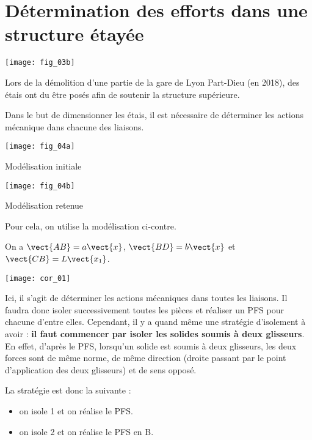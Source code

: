 \section*{Détermination des efforts dans une structure étayée}

\ifprof
\else

\begin{marginfigure}
\texttt{[image: fig\_03b]}
\end{marginfigure}

Lors de la démolition d'une partie de la gare de Lyon Part-Dieu (en 2018), des étais ont du être posés afin de soutenir la structure supérieure. 


Dans le but de dimensionner les étais, il est nécessaire de déterminer les actions mécanique dans chacune des liaisons. 


\begin{marginfigure}
\centering
\texttt{[image: fig\_04a]}
\caption{Modélisation initiale}
\end{marginfigure}


\begin{marginfigure}
\centering
\texttt{[image: fig\_04b]}
\caption{Modélisation retenue}
\end{marginfigure}

Pour cela, on utilise la modélisation ci-contre. 



On a $\vect{AB}=a \vect{x}$,  $\vect{BD}=b \vect{x}$ et  $\vect{CB}=L \vect{x_1}$.
\fi

\ifprof
\begin{corrige}
\begin{center}
\texttt{[image: cor\_01]}
\end{center}

\end{corrige}
\else
\fi

\ifprof
\begin{corrige}
Ici, il s'agit de déterminer les actions mécaniques dans toutes les liaisons. Il faudra donc isoler successivement toutes les pièces et réaliser un PFS pour chacune d'entre elles. Cependant, il y a quand même une stratégie d'isolement à avoir : \textbf{il faut commencer par isoler les solides soumis à deux glisseurs}. En effet, d'après le PFS, lorsqu'un solide est soumis à deux glisseurs, les deux forces sont de même norme, de même direction (droite passant par le point d'application des deux glisseurs) et de sens opposé. 

La stratégie est donc la suivante : 
\begin{itemize}
\item on isole 1 et on réalise le PFS. 
\item on isole 2 et on réalise le PFS en B. 
\end{itemize} 


\end{corrige}
\else
\fi


